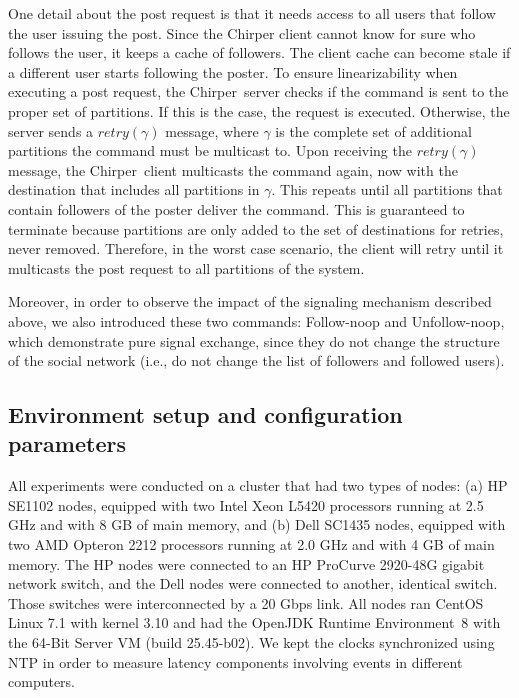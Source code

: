 \documentclass[11pt]{article}
\newcommand{\appname}{Chirper} %
\begin{document}
One detail about the post request is that it needs access to all users that follow the user issuing the post.
Since the \appname{} client cannot know for sure who follows the user, it keeps a cache of followers.
The client cache can become stale if a different user starts following the poster.
To ensure linearizability when executing a post request, the \appname\ server checks if the command is sent to the proper set of partitions. 
If this is the case, the request is executed.
Otherwise, the server sends a $retry(\gamma)$ message, where $\gamma$ is the complete set of additional partitions the command must be multicast to. Upon receiving the $retry(\gamma)$ message, the \appname\ client multicasts the command again, now with the destination that includes all partitions in $\gamma$. This repeats until all partitions that contain followers of the poster deliver the command. This is guaranteed to terminate because partitions are only added to the set of destinations for retries, never removed. Therefore, in the worst case scenario, the client will retry until it multicasts the post request to all partitions of the system.

Moreover, in order to observe the impact of the signaling mechanism described above, we also introduced these two commands: Follow-noop and Unfollow-noop, which demonstrate pure signal exchange, since they do not change the structure of the social network (i.e., do not change the list of followers and followed users).


\subsection{Environment setup and configuration parameters}
\label{sec:evaluation:setup}

All experiments were conducted on a cluster that had two types of nodes: (a) HP SE1102 nodes, equipped with two Intel Xeon L5420 processors running at 2.5 GHz and with 8 GB of main memory, and (b) Dell SC1435 nodes, equipped with two AMD Opteron 2212 processors running at 2.0 GHz and with 4 GB of main memory. The HP nodes were connected to an HP ProCurve 2920-48G gigabit network switch, and the Dell nodes were connected to another, identical switch. Those switches were interconnected by a 20 Gbps link.
All nodes ran CentOS Linux 7.1 with kernel 3.10 and had the OpenJDK Runtime Environment~8 with the \mbox{64-Bit} Server VM (build 25.45-b02).
We kept the clocks synchronized using NTP in order to measure latency components involving events in different computers.
\end{document}
